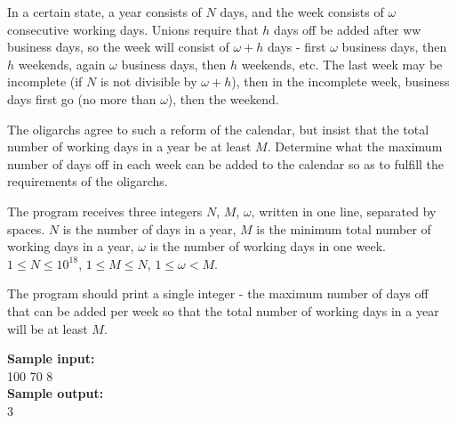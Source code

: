 \documentclass[a4paper]{article}
\begin{document}
In a certain state, a year consists of $N$ days, and the week consists of $\omega$ consecutive working days. Unions require that $h$ days off be added after ww business days, so the week will consist of $\omega + h$ days - first $\omega$ business days, then $h$ weekends, again $\omega$ business days, then $h$ weekends, etc. The last week may be incomplete (if $N$ is not divisible by $\omega + h$), then in the incomplete week, business days first go (no more than $\omega$), then the weekend.

The oligarchs agree to such a reform of the calendar, but insist that the total number of working days in a year be at least $M$. Determine what the maximum number of days off in each week can be added to the calendar so as to fulfill the requirements of the oligarchs.

The program receives three integers $N$, $M$, $\omega$, written in one line, separated by spaces. $N$ is the number of days in a year, $M$ is the minimum total number of working days in a year, $\omega$ is the number of working days in one week. $1 \le N \le 10^{18}$, $1 \le M \le N$, $1 \le \omega < M$.

The program should print a single integer - the maximum number of days off that can be added per week so that the total number of working days in a year will be at least $M$.

\LINE

\noindent \textbf{Sample input:}\\
100 70 8\\

\noindent \textbf{Sample output:}\\
3
\end{document}
